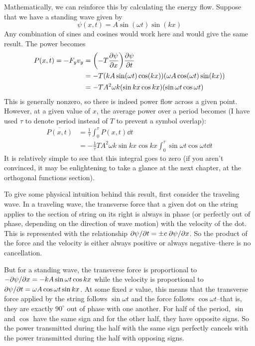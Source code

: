 Mathematically, we can reinforce this by calculating the energy flow. Suppose that we have a standing wave given by
\[ \psi(x,t) = A\sin(\omega t)\sin(kx) \]
Any combination of sines and cosines would work here and would give the same result. The power becomes
\begin{align*}
    P(x,t) = -F_y v_y &= \pqty{-T\pdv{\psi}{x}}\pdv{\psi}{t} \\
    &= -T(kA\sin(\omega t)\cos(kx))(\omega A\cos(\omega t)\sin(kx)) \\
    &= -TA^2\omega k (\sin kx \cos kx)(\sin \omega t\cos \omega t)
\end{align*}
This is generally nonzero, so there is indeed power flow across a given point. However, at a given value of $x$, the average power over a period becomes (I have used $\tau$ to denote period instead of $T$ to prevent a symbol overlap):
\begin{align*}
    \overline{P(x,t)} &= \frac{1}{\tau }\int_0^\tau P(x,t)\dd t \\
    &= -\frac{1}{\tau}TA^2\omega k\sin kx\cos kx\int_0^\tau \sin \omega t\cos\omega t \dd t 
\end{align*}
It is relatively simple to see that this integral goes to zero (if you aren't convinced, it may be enlightening to take a glance at the next chapter, at the orthogonal functions section).

To give some physical intuition behind this result, first consider the traveling wave. In a traveling wave, the transverse force that a given dot on the string applies to the section of string on its right is always in phase (or perfectly out of phase, depending on the direction of wave motion) with the velocity of the dot. This is represented with the relationship $\partial \psi/\partial t = \pm c\; \partial \psi/\partial x$. So the product of the force and the velocity is either always positive or always negative--there is no cancellation.

But for a standing wave, the transverse force is proportional to $-\partial \psi/\partial x = -kA\sin\omega t\cos kx$ while the velocity is proportional to $\partial \psi/\partial t = \omega A\cos\omega t\sin kx$. At some fixed $x$ value, this means that the transverse force applied by the string follows $\sin\omega t$ and the force follows $\cos\omega t$--that is, they are exactly $90^\circ$ out of phase with one another. For half of the period, $\sin$ and $\cos$ have the same sign and for the other half, they have opposite signs. So the power transmitted during the half with the same sign perfectly cancels with the power transmitted during the half with opposing signs.
